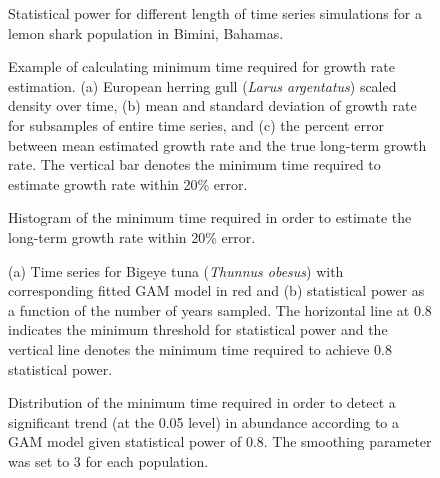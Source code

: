 \documentclass[12pt,]{article}
\begin{document}
\begin{figure}[htbp]
\centering
\caption{Statistical power for different length of time series
simulations for a lemon shark population in Bimini,
Bahamas.\label{fig:shark_example}}
\end{figure}

\begin{figure}[htbp]
\centering
\caption{Example of calculating minimum time required for growth rate
estimation. (a) European herring gull (\emph{Larus argentatus}) scaled
density over time, (b) mean and standard deviation of growth rate for
subsamples of entire time series, and (c) the percent error between mean
estimated growth rate and the true long-term growth rate. The vertical
bar denotes the minimum time required to estimate growth rate within
20\% error.\label{fig:growth_rate}}
\end{figure}

\begin{figure}[htbp]
\centering
\caption{Histogram of the minimum time required in order to estimate the
long-term growth rate within 20\%
error.\label{fig:min_time_growth_dist}}
\end{figure}

\begin{figure}[htbp]
\centering
\caption{(a) Time series for Bigeye tuna (\emph{Thunnus obesus}) with
corresponding fitted GAM model in red and (b) statistical power as a
function of the number of years sampled. The horizontal line at 0.8
indicates the minimum threshold for statistical power and the vertical
line denotes the minimum time required to achieve 0.8 statistical
power.\label{fig:gam_example}}
\end{figure}

\begin{figure}[htbp]
\centering
\caption{Distribution of the minimum time required in order to detect a
significant trend (at the 0.05 level) in abundance according to a GAM
model given statistical power of 0.8. The smoothing parameter was set to
3 for each population.\label{fig:min_time_dist_gam}}
\end{figure}
\end{document}
